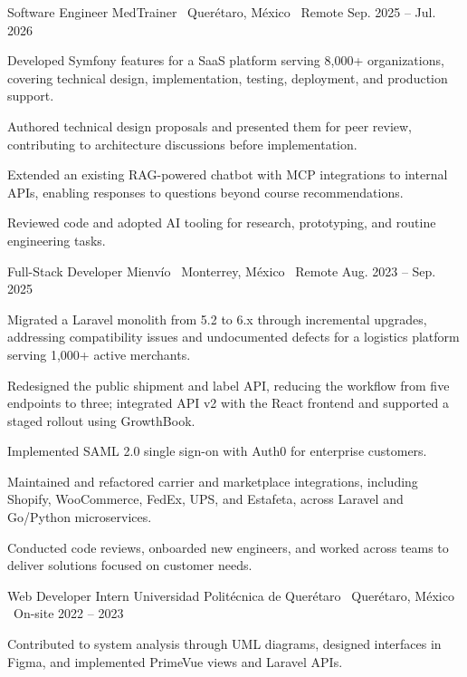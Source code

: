 
\job
{Software Engineer}
{MedTrainer \textbar\ Querétaro, México \textbar\ Remote}
{Sep. 2025 -- Jul. 2026}
{}

\begin{jobitems}

\item Developed Symfony features for a SaaS platform serving 8,000+ organizations, covering technical design, implementation, testing, deployment, and production support.

\item Authored technical design proposals and presented them for peer review, contributing to architecture discussions before implementation.

\item Extended an existing RAG-powered chatbot with MCP integrations to internal APIs, enabling responses to questions \mbox{beyond} course recommendations.

\item Reviewed code and adopted AI tooling for research, prototyping, and routine engineering tasks.

\end{jobitems}


\job
{Full-Stack Developer}
{Mienvío \textbar\ Monterrey, México \textbar\ Remote}
{Aug. 2023 -- Sep. 2025}
{}

\begin{jobitems}

\item Migrated a Laravel monolith from 5.2 to 6.x through incremental upgrades, addressing compatibility issues and undocumented defects for a logistics platform serving 1,000+ active merchants.

\item Redesigned the public shipment and label API, reducing the workflow from five endpoints to three; integrated API v2 with the React frontend and supported a staged rollout using GrowthBook.

\item Implemented SAML 2.0 single sign-on with Auth0 for enterprise customers.

\item Maintained and refactored carrier and marketplace integrations, including Shopify, WooCommerce, FedEx, UPS, and Estafeta, across Laravel and Go/Python microservices.

\item Conducted code reviews, onboarded new engineers, and worked across teams to deliver solutions focused on customer needs.

\end{jobitems}


\job
{Web Developer Intern}
{Universidad Politécnica de Querétaro \textbar\ Querétaro, México \textbar\ On-site}
{2022 -- 2023}
{}

\begin{jobitems}

\item Contributed to system analysis through UML diagrams, designed interfaces in Figma, and implemented PrimeVue views and Laravel APIs.

\end{jobitems}
